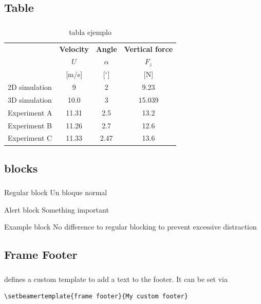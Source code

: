 \subsection{Table}
\begin{frame}
  \frametitle{\insertsectionhead}
  \framesubtitle{\insertsubsectionhead}
  \begin{table}[H]
    \centering
    \caption{tabla ejemplo}
    \begin{tabular}{@{} lccc @{}}
      \toprule
      & \textbf{Velocity} & \textbf{Angle}  & \textbf{Vertical force} \\
      & $U$ & $\alpha$  & $F_z$ \\
      & [m/s] & [$^\circ$]  & [N] \\
      \midrule
      2D simulation  & 9 & 2 & 9.23 \\
      3D simulation  & 10.0 & 3 & 15.039 \\
      Experiment A   & 11.31 & 2.5 & 13.2 \\
      Experiment B   & 11.26 & 2.7 & 12.6 \\
      Experiment C   & 11.33 & 2.47 & 13.6 \\
      \bottomrule
    \end{tabular}
  \end{table}

\end{frame}

\subsection{blocks}
\begin{frame}
  \frametitle{\insertsectionhead}
  \framesubtitle{\insertsubsectionhead}
  \begin{block}{Regular block}
    Un bloque normal
  \end{block}
  \begin{alertblock}{Alert block}
    Something important
  \end{alertblock}
  \begin{exampleblock}{Example block}
    No difference to regular blocking to prevent excessive distraction
  \end{exampleblock}
\end{frame}

\subsection{Frame Footer}
{
\begin{frame}[fragile]
  \frametitle{\insertsectionhead}
  \framesubtitle{\insertsubsectionhead}
    \themename defines a custom template to add a text to the footer. It can be set via
    \begin{verbatim}\setbeamertemplate{frame footer}{My custom footer}\end{verbatim}
\end{frame}
}

